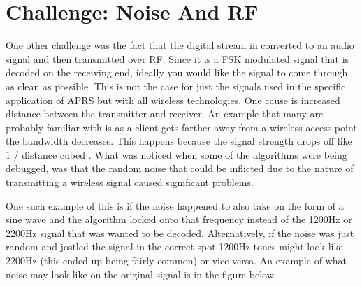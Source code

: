 \section{Challenge: Noise And RF}
One other challenge was the fact that the digital stream in converted to an audio signal and then transmitted over RF. Since it is a FSK modulated signal that is decoded on the receiving end, ideally you would like the signal to come through as clean as possible. This is not the case for just the signals used in the specific application of APRS but with all wireless technologies. One cause is increased distance between the transmitter and receiver. An example that many are probably familiar with is as a client gets farther away from a wireless access point the bandwidth decreases. This happens because the signal strength drops off like 1 / distance cubed \cite{4Gon}. What was noticed when some of the algorithms were being debugged, was that the random noise that could be inflicted due to the nature of transmitting a wireless signal caused significant problems.

One such example of this is if the noise happened to also take on the form of a sine wave and the algorithm locked onto that frequency instead of the 1200Hz or 2200Hz signal that was wanted to be decoded. Alternatively, if the noise was just random and jostled the signal in the correct spot 1200Hz tones might look like 2200Hz (this ended up being fairly common) or vice versa. An example of what noise may look like on the original signal is in the figure below.


